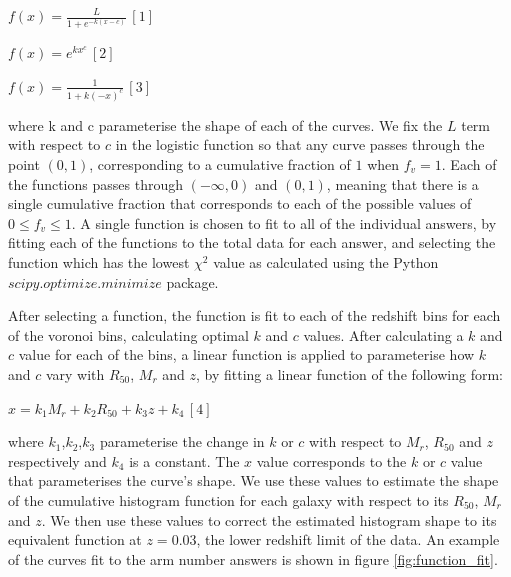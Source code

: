 \documentclass[useAMS,usenatbib]{mn2e}
\begin{document}
\begin{center}
$f(x) = \frac{L}{1+e^{-k(x-c)}} \, [1]$
\end{center}

\begin{center}
$f(x) = e^{kx^{c}} \, [2]$
\end{center}

\begin{center}
$f(x) = \frac{1}{1 + k(-x)^c} \, [3]$
\end{center}

where k and c parameterise the shape of each of the curves. We fix the $L$ term with respect to $c$ in the logistic function so that any curve passes through the point $(0,1)$, corresponding to a cumulative fraction of $1$ when $f_v = 1$. Each of the functions passes through $(-\infty,0)$ and $(0,1)$, meaning that there is a single cumulative fraction that corresponds to each of the possible values of $0 \leq f_v \leq 1$. A single function is chosen to fit to all of the individual answers, by fitting each of the functions to the total data for each answer, and selecting the function which has the lowest $\chi^2$ value as calculated using the Python $scipy.optimize.minimize$ package. 

After selecting a function, the function is fit to each of the redshift bins for each of the voronoi bins, calculating optimal $k$ and $c$ values. After calculating a $k$ and $c$ value for each of the bins, a linear function is applied to parameterise how $k$ and $c$ vary with $R_{50}$, $M_r$ and $z$, by fitting a linear function of the following form:

\begin{center}
$x = k_1M_r + k_2R_{50} +k_3z + k_4 \, [4]$
\end{center}

where $k_1$,$k_2$,$k_3$ parameterise the change in $k$ or $c$ with respect to $M_r$, $R_{50}$ and $z$ respectively and $k_4$ is a constant. The $x$ value corresponds to the $k$ or $c$ value that parameterises the curve's shape. We use these values to estimate the shape of the cumulative histogram function for each galaxy with respect to its $R_{50}$, $M_r$ and $z$. We then use these values to correct the estimated histogram shape to its equivalent function at $z=0.03$, the lower redshift limit of the data. An example of the curves fit to the arm number answers is shown in figure \ref{fig:function_fit}. 
\end{document}
